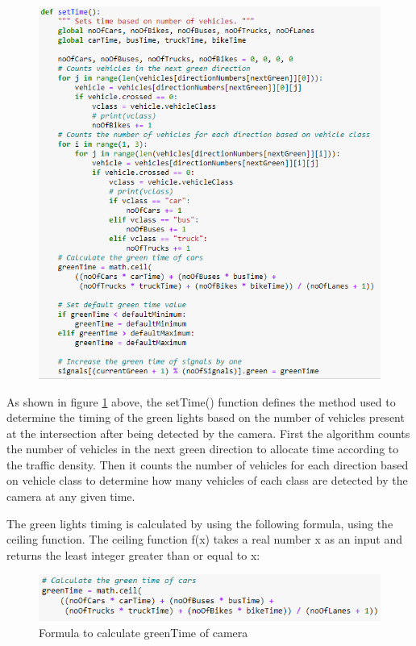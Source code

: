 \documentclass[12pt, a4paper,titlepage]{article}
\begin{document}
\begin{figure}[H]
	\centering
	\includegraphics[width=\linewidth]{images/c3}
	\caption{}
	\label{fig:c3}
\end{figure}

As shown in figure \ref{fig:c3} above, the setTime() function defines the method used to determine the timing of the green lights based on the number of vehicles present at the intersection after being detected by the camera. First the algorithm counts the number of vehicles in the next green direction to allocate time according to the traffic density. Then it counts the number of vehicles for each direction based on vehicle class to determine how many vehicles of each class are detected by the camera at any given time. 

The green lights timing is calculated by using the following formula, using the ceiling function. The ceiling function f(x) takes a real number x as an input and returns the least integer greater than or equal to x:

\begin{figure}[H]
	\centering
	\includegraphics[width=\linewidth]{images/f1}
	\caption{Formula to calculate greenTime of camera}
	\label{fig:f1}
\end{figure}
\end{document}
